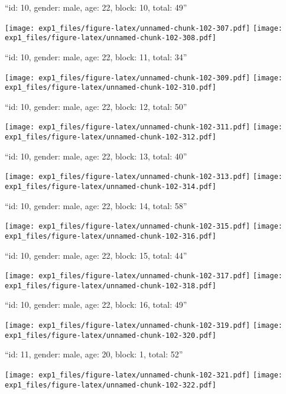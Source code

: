 \documentclass[11pt,,]{article}
\begin{document}
\newpage
[1] 

``id: 10, gender: male, age: 22, block: 10, total: 49''

\texttt{[image: exp1\_files/figure-latex/unnamed-chunk-102-307.pdf]}
\texttt{[image: exp1\_files/figure-latex/unnamed-chunk-102-308.pdf]}

\newpage
[1] 

``id: 10, gender: male, age: 22, block: 11, total: 34''

\texttt{[image: exp1\_files/figure-latex/unnamed-chunk-102-309.pdf]}
\texttt{[image: exp1\_files/figure-latex/unnamed-chunk-102-310.pdf]}

\newpage
[1] 

``id: 10, gender: male, age: 22, block: 12, total: 50''

\texttt{[image: exp1\_files/figure-latex/unnamed-chunk-102-311.pdf]}
\texttt{[image: exp1\_files/figure-latex/unnamed-chunk-102-312.pdf]}

\newpage
[1] 

``id: 10, gender: male, age: 22, block: 13, total: 40''

\texttt{[image: exp1\_files/figure-latex/unnamed-chunk-102-313.pdf]}
\texttt{[image: exp1\_files/figure-latex/unnamed-chunk-102-314.pdf]}

\newpage
[1] 

``id: 10, gender: male, age: 22, block: 14, total: 58''

\texttt{[image: exp1\_files/figure-latex/unnamed-chunk-102-315.pdf]}
\texttt{[image: exp1\_files/figure-latex/unnamed-chunk-102-316.pdf]}

\newpage
[1] 

``id: 10, gender: male, age: 22, block: 15, total: 44''

\texttt{[image: exp1\_files/figure-latex/unnamed-chunk-102-317.pdf]}
\texttt{[image: exp1\_files/figure-latex/unnamed-chunk-102-318.pdf]}

\newpage
[1] 

``id: 10, gender: male, age: 22, block: 16, total: 49''

\texttt{[image: exp1\_files/figure-latex/unnamed-chunk-102-319.pdf]}
\texttt{[image: exp1\_files/figure-latex/unnamed-chunk-102-320.pdf]}

\newpage
[1] 

``id: 11, gender: male, age: 20, block: 1, total: 52''

\texttt{[image: exp1\_files/figure-latex/unnamed-chunk-102-321.pdf]}
\texttt{[image: exp1\_files/figure-latex/unnamed-chunk-102-322.pdf]}
\end{document}
